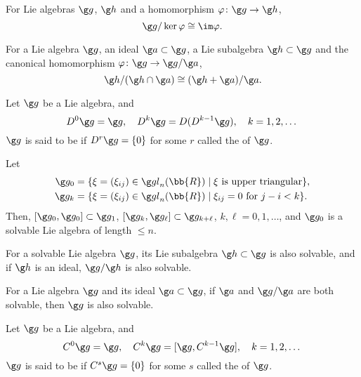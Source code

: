For Lie algebras $\g g$, $\g h$ and a homomorphism $\varphi \colon \g g \to \g h$,
\[
\g g / \ker \varphi \cong \im \varphi.
\]

For a Lie algebra $\g g$, an ideal $\g a \subset \g g$, a Lie subalgebra $\g h \subset \g g$ and the canonical homomorphism $\varphi \colon \g g \to \g g / \g a$,
\[
\g h / (\g h \cap \g a) \cong (\g h + \g a)/\g a.
\]

Let $\g g$ be a Lie algebra, and
\[
D^0\g g = \g g,\quad D^k \g g = D(D^{k-1}\g g),\quad k = 1, 2, \dotsc
\]
$\g g$ is said to be  if $D^r\g g = \{ 0 \}$ for some $r$ called the  of $\g g$.

Let
\begin{align*}
\g g_0 &= \{ \xi = (\xi_{ij}) \in \gl_n(\bb{R}) \mid \xi\ \text{is upper triangular} \}, \\
\g g_k &= \{ \xi = (\xi_{ij}) \in \gl_n(\bb{R}) \mid \xi_{ij} = 0 \ \text{for}\ j - i < k \}.
\end{align*}
Then, $[\g g_0, \g g_0] \subset \g g_1$, $[\g g_k, \g g_\ell] \subset \g g_{k+\ell}$, $k, \ell = 0, 1, \dotsc$, and $\g g_0$ is a solvable Lie algebra of length $\le n$.

For a solvable Lie algebra $\g g$, its Lie subalgebra $\g h \subset \g g$ is also solvable, and if $\g h$ is an ideal, $\g g / \g h$ is also solvable.

For a Lie algebra $\g g$ and its ideal $\g a \subset \g g$, if $\g a$ and $\g g / \g a$ are both solvable, then $\g g$ is also solvable.

Let $\g g$ be a Lie algebra, and
\[
C^0 \g g = \g g,\quad C^k \g g = [\g g, C^{k-1}\g g],\quad k = 1, 2, \dotsc
\]
$\g g$ is said to be  if $C^s \g g = \{ 0 \}$ for some $s$ called the  of $\g g$.

